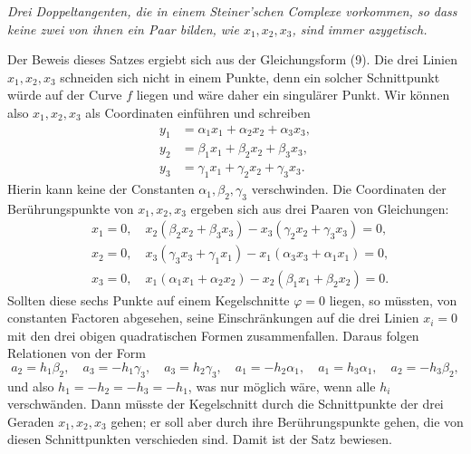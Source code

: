 \documentclass[11pt]{article}
\begin{document}
\emph{Drei Doppeltangenten, die in einem Steiner'schen Complexe vorkommen, so dass keine zwei von ihnen ein Paar bilden, wie \(x_1,x_2,x_3\), sind immer azygetisch.}

Der Beweis dieses Satzes ergiebt sich aus der Gleichungsform (9). Die drei Linien \(x_1,x_2,x_3\) schneiden sich nicht in einem Punkte, denn ein solcher Schnittpunkt würde auf der Curve \(f\) liegen und wäre daher ein singulärer Punkt. Wir können also \(x_1,x_2,x_3\) als Coordinaten einführen und schreiben
\begin{align*}
 y_1&=\alpha_1x_1+\alpha_2x_2+\alpha_3x_3,\\
 y_2&=\beta_1x_1+\beta_2x_2+\beta_3x_3,\\
 y_3&=\gamma_1x_1+\gamma_2x_2+\gamma_3x_3.
\end{align*}
Hierin kann keine der Constanten \(\alpha_1,\beta_2,\gamma_3\) verschwinden. Die Coordinaten der Berührungspunkte von \(x_1,x_2,x_3\) ergeben sich aus drei Paaren von Gleichungen:
\begin{align*}
&x_1=0,\quad x_2(\beta_2x_2+\beta_3x_3)-x_3(\gamma_2x_2+\gamma_3x_3)=0,\\
&x_2=0,\quad x_3(\gamma_3x_3+\gamma_1x_1)-x_1(\alpha_3x_3+\alpha_1x_1)=0,\\
&x_3=0,\quad x_1(\alpha_1x_1+\alpha_2x_2)-x_2(\beta_1x_1+\beta_2x_2)=0.
\end{align*}
Sollten diese sechs Punkte auf einem Kegelschnitte \(\varphi=0\) liegen, so müssten, von constanten Factoren abgesehen, seine Einschränkungen auf die drei Linien \(x_i=0\) mit den drei obigen quadratischen Formen zusammenfallen. Daraus folgen Relationen von der Form
\begin{equation}
 a_2=h_1\beta_2,
\quad a_3=-h_1\gamma_3,
\quad a_3=h_2\gamma_3,
\quad a_1=-h_2\alpha_1,
\quad a_1=h_3\alpha_1,
\quad a_2=-h_3\beta_2,
 \tag{10}
\end{equation}
und also \(h_1=-h_2=-h_3=-h_1\), was nur möglich wäre, wenn alle \(h_i\) verschwänden. Dann müsste der Kegelschnitt durch die Schnittpunkte der drei Geraden \(x_1,x_2,x_3\) gehen; er soll aber durch ihre Berührungspunkte gehen, die von diesen Schnittpunkten verschieden sind. Damit ist der Satz bewiesen.
\end{document}
